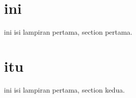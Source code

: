 \label{lamp1}

\section{ini}
ini isi lampiran pertama, section pertama.

\section{itu}
ini isi lampiran pertama, section kedua.


